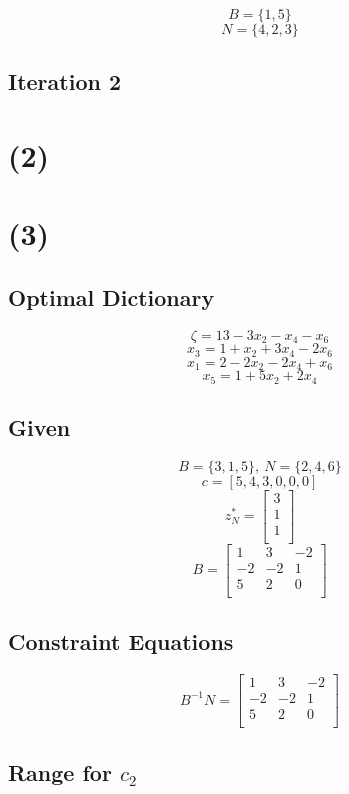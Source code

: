 \documentclass[14pt]{extarticle}
\begin{document}
\[
    B = \{1, 5\}
\]
\[
    N = \{4, 2, 3\}
\]

\subsection*{Iteration 2}

\section*{(2)}

\section*{(3)}
\subsection*{Optimal Dictionary}
\[
    \zeta = 13-3x_2-x_4-x_6
\]
\[
    x_3 = 1+x_2+3x_4-2x_6
\]
\[
    x_1 = 2-2x_2-2x_4+x_6
\]
\[
    x_5 = 1+5x_2+2x_4
\]

\subsection*{Given}
\[
    B = \{3, 1, 5\},\ N = \{2, 4, 6\}
\]
\[
    c = [5, 4, 3, 0, 0, 0]
\]
\[
    z^*_N = \begin{bmatrix}
        3 \\
        1 \\
        1 \\
    \end{bmatrix}
\]
\[
    B = \begin{bmatrix}
        1 & 3 & -2 \\
        -2 & -2 & 1 \\
        5 & 2 & 0 \\
    \end{bmatrix}
\]

\subsection*{Constraint Equations}
\[
    B^{-1}N = \begin{bmatrix}
        1 & 3 & -2 \\
        -2 & -2 & 1 \\
        5 & 2 & 0 \\
    \end{bmatrix}
\]

\subsection*{Range for $c_2$}
\end{document}
